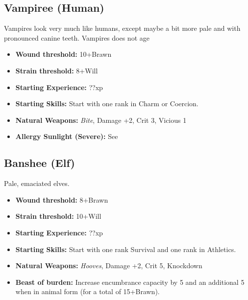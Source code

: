 \documentclass{book}
\begin{document}
\begin{multicols}{2}
	\subsection{Vampiree (Human)}
	Vampires look very much like humans, except maybe a bit more pale and with pronounced canine teeth. Vampires does not age
	
	\begin{itemize}
		\item \textbf{Wound threshold:} 10+Brawn
		\item \textbf{Strain threshold:} 8+Will
		\item \textbf{Starting Experience:} ??xp
		\item \textbf{Starting Skills:} Start with one rank in Charm or Coercion.
		\item \textbf{Natural Weapons:} \textit{Bite}, Damage +2, Crit 3, Vicious 1
		\item \textbf{Allergy Sunlight (Severe):} See \pageref{allergysunlight} 	
	\end{itemize}
	
	\subsection{Banshee (Elf)}
	Pale, emaciated elves.
	
	\begin{itemize}
		\item \textbf{Wound threshold:} 8+Brawn
		\item \textbf{Strain threshold:} 10+Will
		\item \textbf{Starting Experience:} ??xp
		\item \textbf{Starting Skills:} Start with one rank Survival and one rank in Athletics.
		\item \textbf{Natural Weapons:} \textit{Hooves}, Damage +2, Crit 5, Knockdown
		\item \textbf{Beast of burden:} Increase encumbrance capacity by 5 and an additional 5 when in animal form (for a total of 15+Brawn).
	\end{itemize}
	
\end{multicols}
\mbox{ }
\end{document}
